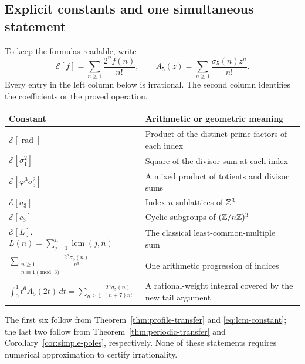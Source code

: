 \subsection{Explicit constants and one simultaneous statement}

To keep the formulas readable, write
\[
 \mathcal E[f]=\sum_{n\geq1}\frac{2^nf(n)}{n!},
 \qquad A_5(z)=\sum_{n\geq1}\frac{\sigma_5(n)z^n}{n!}.
\]
Every entry in the left column below is irrational.  The second
column identifies the coefficients or the proved operation.
\begin{center}
\small
\begin{tabular}{p{}p{}}
\toprule
Constant & Arithmetic or geometric meaning\\
\midrule
$\mathcal E[\operatorname{rad}]$
 & Product of the distinct prime factors of each index\\[4pt]
$\mathcal E[\sigma_1^2]$
 & Square of the divisor sum at each index\\[4pt]
$\mathcal E[\varphi^3\sigma_5^2]$
 & A mixed product of totients and divisor sums\\[4pt]
$\mathcal E[a_3]$
 & Index-$n$ sublattices of $\mathbb Z^3$~\cite{Zou06}\\[4pt]
$\mathcal E[c_3]$
 & Cyclic subgroups of $(\mathbb Z/n\mathbb Z)^3$~\cite{Toth12}\\[4pt]
$\mathcal E[L]$, $L(n)=\sum_{j=1}^n\operatorname{lcm}(j,n)$
 & The classical least-common-multiple sum~\cite{IM14}\\[4pt]
$\displaystyle\sum_{\substack{n\geq1\\ n\equiv1\!\!\pmod3}}
             \frac{2^n\sigma_5(n)}{n!}$
 & One arithmetic progression of indices\\[9pt]
$\displaystyle\int_0^1t^6A_5(2t)\,dt
       =\sum_{n\geq1}\frac{2^n\sigma_5(n)}{(n+7)n!}$
 & A rational-weight integral covered by the new tail argument\\
\bottomrule
\end{tabular}
\end{center}
The first six follow from Theorem~\ref{thm:profile-transfer} and
\eqref{eq:lcm-constant}; the last two follow from
Theorem~\ref{thm:periodic-transfer} and
Corollary~\ref{cor:simple-poles}, respectively.  None of these
statements requires numerical approximation to certify irrationality.

